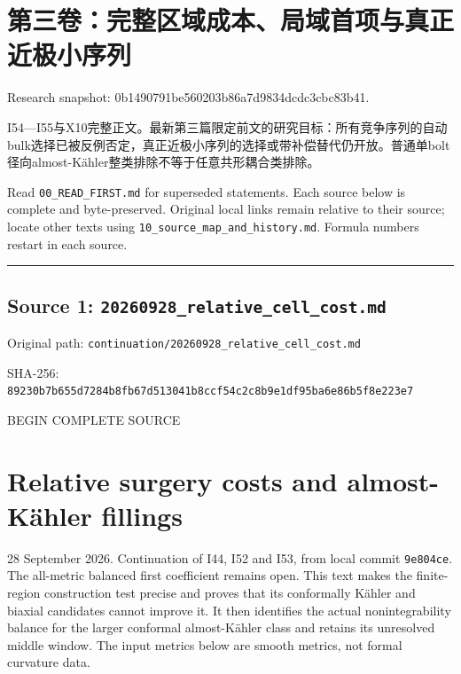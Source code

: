 \documentclass[
  10pt,
]{article}
\author{}
\date{}
\begin{document}
\hypertarget{ux7b2cux4e09ux5377ux5b8cux6574ux533aux57dfux6210ux672cux5c40ux57dfux9996ux9879ux4e0eux771fux6b63ux8fd1ux6781ux5c0fux5e8fux5217}{%
\section{第三卷：完整区域成本、局域首项与真正近极小序列}\label{ux7b2cux4e09ux5377ux5b8cux6574ux533aux57dfux6210ux672cux5c40ux57dfux9996ux9879ux4e0eux771fux6b63ux8fd1ux6781ux5c0fux5e8fux5217}}

Research snapshot: 0b1490791be560203b86a7d9834dcdc3cbc83b41.

I54---I55与X10完整正文。最新第三篇限定前文的研究目标：所有竞争序列的自动bulk选择已被反例否定，真正近极小序列的选择或带补偿替代仍开放。普通单bolt径向almost-Kähler整类排除不等于任意共形耦合类排除。

Read \nolinkurl{00_READ_FIRST.md} for superseded statements. Each source below is
complete and byte-preserved. Original local links remain relative to
their source; locate other texts using \nolinkurl{10_source_map_and_history.md}.
Formula numbers restart in each source.

\begin{center}\rule{0.5\linewidth}{0.5pt}\end{center}

\hypertarget{source-1-20260928_relative_cell_cost.md}{%
\subsection{Source 1:
\nolinkurl{20260928_relative_cell_cost.md}}\label{source-1-20260928_relative_cell_cost.md}}

Original path: \nolinkurl{continuation/20260928_relative_cell_cost.md}

SHA-256:
\nolinkurl{89230b7b655d7284b8fb67d513041b8ccf54c2c8b9e1df95ba6e86b5f8e223e7}

BEGIN COMPLETE SOURCE

\hypertarget{relative-surgery-costs-and-almost-kuxe4hler-fillings}{%
\section{Relative surgery costs and almost-Kähler
fillings}\label{relative-surgery-costs-and-almost-kuxe4hler-fillings}}

28 September 2026. Continuation of I44, I52 and I53, from local commit
\texttt{9e804ce}. The all-metric balanced first coefficient remains
open. This text makes the finite-region construction test precise and
proves that its conformally Kähler and biaxial candidates cannot improve
it. It then identifies the actual nonintegrability balance for the
larger conformal almost-Kähler class and retains its unresolved middle
window. The input metrics below are smooth metrics, not formal curvature
data.
\end{document}
